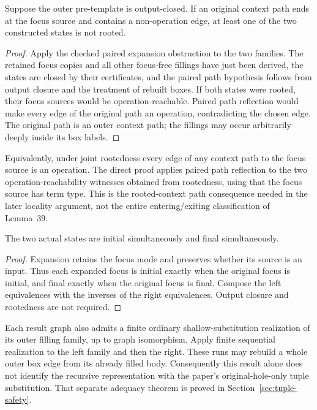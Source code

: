 \begin{theorem}
Suppose the outer pre-template is output-closed. If an original context
path ends at the focus source and contains a non-operation edge, at
least one of the two constructed states is not rooted.
\end{theorem}
\begin{proof}
Apply the checked paired expansion obstruction to the two families.
The retained focus copies and all other focus-free fillings have just
been derived, the states are closed by their certificates, and the
paired path hypothesis follows from output closure and the treatment
of rebuilt boxes. If both states were rooted, their focus sources
would be operation-reachable. Paired path reflection would make every
edge of the original path an operation, contradicting the chosen edge.
The original path is an outer context path; the fillings may occur
arbitrarily deeply inside its box labels.
\end{proof}

Equivalently, under joint rootedness every edge of any context path
to the focus source is an operation. The direct proof applies paired
path reflection to the two operation-reachability witnesses obtained
from rootedness, using that the focus source has term type. This is
the rooted-context path consequence needed in the later locality
argument, not the entire entering/exiting classification of Lemma~39.

\begin{theorem}
The two actual states are initial simultaneously and final simultaneously.
\end{theorem}
\begin{proof}
Expansion retains the focus mode and preserves whether its source
is an input. Thus each expanded focus is initial exactly when the
original focus is initial, and final exactly when the original focus
is final. Compose the left equivalences with the inverses of the
right equivalences. Output closure and rootedness are not required.
\end{proof}

Each result graph also admits a finite ordinary shallow-substitution
realization of its outer filling family, up to graph isomorphism.
Apply finite sequential realization to the left family and then the
right. These runs may rebuild a whole outer box edge from its already
filled body. Consequently this result alone does not identify the recursive
representation with the paper's original-hole-only tuple substitution. That
separate adequacy theorem is proved in Section~\ref{sec:tuple-safety}.

